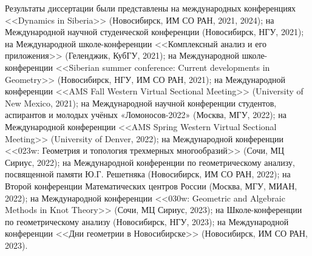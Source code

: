 Результаты диссертации были представлены на международных конференциях <<Dynamics in Siberia>> (Новосибирск, ИМ СО РАН, 2021, 2024); 
на Международной научной студенческой конференции (Новосибирск, НГУ, 2021);
на Международной школе-конференции <<Комплексный анализ и его приложения>> (Геленджик, КубГУ, 2021); 
на Международной школе-конференции <<Siberian summer conference: Current developments in Geometry>> (Новосибирск, НГУ, ИМ СО РАН, 2021); 
на Международной конференции <<AMS Fall Western Virtual Sectional Meeting>> (University of New Mexico, 2021); 
на Международной научной конференции студентов, аспирантов и молодых учёных «Ломоносов-2022» (Москва, МГУ, 2022); 
на Международной конференции <<AMS Spring Western Virtual Sectional Meeting>> (University of Denver, 2022); 
на Международной конференции <<023w: Геометрия и топология трехмерных многообразий>> (Сочи, МЦ Сириус, 2022); 
на Международной конференции по геометрическому анализу, посвященной памяти Ю.Г. Решетняка (Новосибирск, ИМ СО РАН, 2022); 
на Второй конференции Математических центров России (Москва, МГУ, МИАН, 2022); 
на Международной конференции <<030w: Geometric and Algebraic Methods in Knot Theory>> (Сочи, МЦ Сириус, 2023);
на Школе-конференции по геометрическому анализу
(Новосибирск, НГУ, 2023);
на Международной конференции <<Дни геометрии в Новосибирске>> (Новосибирск, ИМ СО РАН, 2023).




